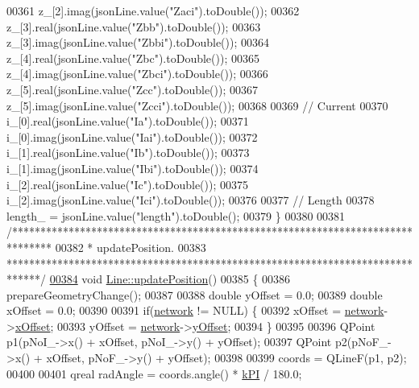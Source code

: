 \begin{DoxyCode}
00361   z\_[2].imag(jsonLine.value(\textcolor{stringliteral}{"Zaci"}).toDouble());
00362   z\_[3].real(jsonLine.value(\textcolor{stringliteral}{"Zbb"}).toDouble());
00363   z\_[3].imag(jsonLine.value(\textcolor{stringliteral}{"Zbbi"}).toDouble());
00364   z\_[4].real(jsonLine.value(\textcolor{stringliteral}{"Zbc"}).toDouble());
00365   z\_[4].imag(jsonLine.value(\textcolor{stringliteral}{"Zbci"}).toDouble());
00366   z\_[5].real(jsonLine.value(\textcolor{stringliteral}{"Zcc"}).toDouble());
00367   z\_[5].imag(jsonLine.value(\textcolor{stringliteral}{"Zcci"}).toDouble());
00368 
00369   \textcolor{comment}{// Current}
00370   i\_[0].real(jsonLine.value(\textcolor{stringliteral}{"Ia"}).toDouble());
00371   i\_[0].imag(jsonLine.value(\textcolor{stringliteral}{"Iai"}).toDouble());
00372   i\_[1].real(jsonLine.value(\textcolor{stringliteral}{"Ib"}).toDouble());
00373   i\_[1].imag(jsonLine.value(\textcolor{stringliteral}{"Ibi"}).toDouble());
00374   i\_[2].real(jsonLine.value(\textcolor{stringliteral}{"Ic"}).toDouble());
00375   i\_[2].imag(jsonLine.value(\textcolor{stringliteral}{"Ici"}).toDouble());
00376 
00377   \textcolor{comment}{// Length}
00378   length\_ = jsonLine.value(\textcolor{stringliteral}{"length"}).toDouble();
00379 \}
00380 
00381 \textcolor{comment}{/*******************************************************************************}
00382 \textcolor{comment}{ * updatePosition.}
00383 \textcolor{comment}{ ******************************************************************************/}
\hypertarget{line_8cpp_source_l00384}{}\hyperlink{group___models_ga8fdb12651d4bc592616d241386b066b3}{00384} \textcolor{keywordtype}{void} \hyperlink{group___models_ga8fdb12651d4bc592616d241386b066b3}{Line::updatePosition}()
00385 \{
00386   prepareGeometryChange();
00387 
00388   \textcolor{keywordtype}{double} yOffset = 0.0;
00389   \textcolor{keywordtype}{double} xOffset = 0.0;
00390 
00391   \textcolor{keywordflow}{if}(\hyperlink{class_line_aefdf6a6c3e3775b5a16b344c1d33964e}{network} != NULL) \{
00392     xOffset = \hyperlink{class_line_aefdf6a6c3e3775b5a16b344c1d33964e}{network}->\hyperlink{class_network_a9f5c70be28a45320802bd0ac3947d114}{xOffset};
00393     yOffset = \hyperlink{class_line_aefdf6a6c3e3775b5a16b344c1d33964e}{network}->\hyperlink{class_network_a771b16f7eb4459d0ca7141c048b1ab59}{yOffset};
00394   \}
00395 
00396   QPoint p1(pNoI\_->x() + xOffset, pNoI\_->y() + yOffset);
00397   QPoint p2(pNoF\_->x() + xOffset, pNoF\_->y() + yOffset);
00398 
00399   coords = QLineF(p1, p2);
00400 
00401   qreal radAngle = coords.angle() * \hyperlink{math__constants_8h_a368d99984512d9a6c6f18b37b4446431}{kPI} / 180.0;

\end{DoxyCode}
